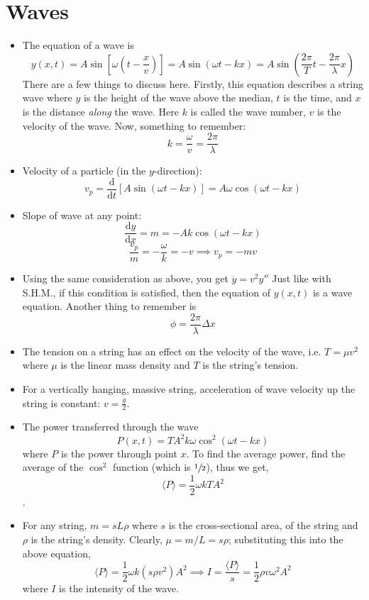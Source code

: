 \documentclass{scrartcl}
\begin{document}
    \section{Waves}
    \begin{itemize}
        \item The equation of a wave is \[y\left(x,t\right)=A\sin\left[\omega\left(t-\frac xv\right)\right]=A\sin\left(\omega t-kx\right)=A\sin\left(\frac{2\pi}Tt-\frac{2\pi}\lambda x\right)  \] There are a few things to discuss here. Firstly, this equation describes a string wave where $y$ is the height of the wave above the median, $t$ is the time, and $x$ is the distance \textit{along} the wave. Here $k$ is called the wave number, $v$ is the velocity of the wave. Now, something to remember:\[k=\frac\omega v=\frac{2\pi}\lambda\]
        \item Velocity of a particle (in the $y$-direction): \[v_p=\frac{\mathrm d}{\mathrm dt}\left[A\sin\left(\omega t-kx\right)\right]=A\omega\cos\left(\omega t-kx\right)\]
        \item Slope of wave at any point: \[\frac{\mathrm dy}{\mathrm dx}=m=-Ak\cos\left(\omega t-kx\right)\]\[\frac{v_p}m=-\frac\omega k=-v\implies v_p=-mv\]
        \item Using the same consideration as above, you get $\boxed{\ddot y=v^2y''}$ Just like with S.H.M., if this condition is satisfied, then the equation of $y(x,t)$  is a wave equation. Another thing to remember is \[\phi=\frac{2\pi}\lambda\Delta x\]
        \item The tension on a string has an effect on the velocity of the wave, i.e. $T=\mu v^2$ where $\mu$ is the linear mass density and $T$ is the string's tension.
        \item For a vertically hanging, massive string, acceleration of wave velocity up the string is constant: $v=\frac g2$.
        \item The power transferred through the wave \[P(x,t)=TA^2k\omega\cos^2\left(\omega t-kx\right)\] where $P$ is the power through point $x$. To find the average power, find the average of the $\cos^2$ function (which is $\sfrac12$), thus we get, \[\langle P\rangle=\frac12\omega kTA^2\].
        \item For any string, $m=sL\rho$ where $s$ is the cross-sectional area, of the string and $\rho$ is the string's density. Clearly, $\mu=m/L=s\rho$; substituting this into the above equation, \[\langle P\rangle=\frac12\omega k\left(s\rho v^2\right)A^2\implies I=\frac{\langle P\rangle}s=\frac12\rho v\omega^2A^2\] where $I$ is the intensity of the wave.

\end{itemize}
\end{document}
